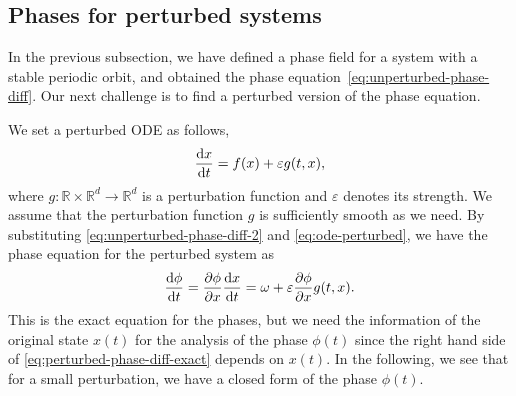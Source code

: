 \subsection{Phases for perturbed systems}
In the previous subsection, we have defined a phase field for a system with a stable periodic orbit,
and obtained the phase equation~\eqref{eq:unperturbed-phase-diff}.
Our next challenge is to find a perturbed version of the phase equation.

We set a perturbed ODE as follows,
\begin{align}
  \frac{\mathrm{d} x}{\mathrm{d} t}=f(x)+\varepsilon g(t,x),
  \label{eq:ode-perturbed}
\end{align}
where $g\colon\mathbb{R}\times\mathbb{R}^{d}\to\mathbb{R}^{d}$ is a perturbation function and $\varepsilon$ denotes its strength.
We assume that the perturbation function $g$ is sufficiently smooth as we need.
By substituting \eqref{eq:unperturbed-phase-diff-2} and \eqref{eq:ode-perturbed},
we have the phase equation for the perturbed system as
\begin{align}
  \frac{\mathrm{d}\phi}{\mathrm{d} t}=\frac{\partial\phi}{\partial x}\frac{\mathrm{d} x}{\mathrm{d} t}=\omega+\varepsilon\frac{\partial\phi}{\partial x}g(t,x).
  \label{eq:perturbed-phase-diff-exact}
\end{align}
This is the exact equation for the phases, but we need the information of the original state $x(t)$ for the analysis of the phase $\phi(t)$ since the right hand side of \eqref{eq:perturbed-phase-diff-exact} depends on $x(t)$.
In the following, we see that for a small perturbation, we have a closed form of the phase $\phi(t)$.

